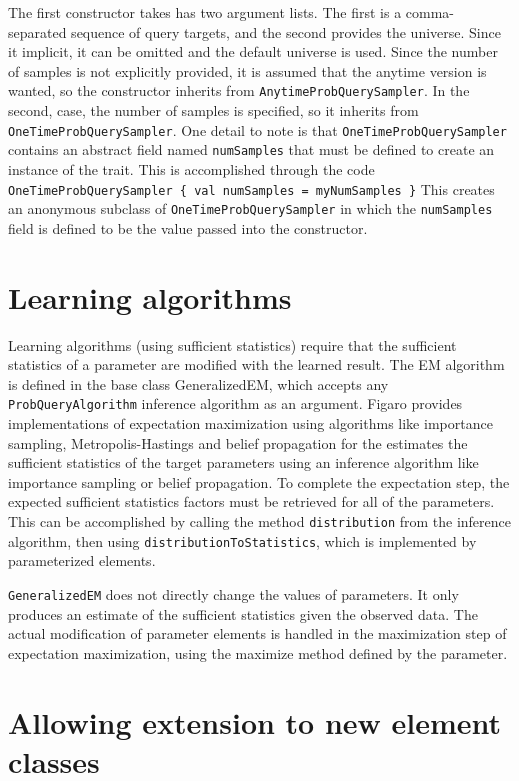 The first constructor takes has two argument lists. The first is a comma-separated sequence of query targets, and the second provides the universe. Since it implicit, it can be omitted and the default universe is used. Since the number of samples is not explicitly provided, it is assumed that the anytime version is wanted, so the constructor inherits from \texttt{AnytimeProbQuerySampler}. In the second, case, the number of samples is specified, so it inherits from \texttt{OneTimeProbQuerySampler}. One detail to note is that \texttt{OneTimeProbQuerySampler} contains an abstract field named \texttt{numSamples} that must be defined to create an instance of the trait. This is accomplished through the code
\newline \texttt{OneTimeProbQuerySampler \{ val numSamples = myNumSamples \}}
This creates an anonymous subclass of \texttt{OneTimeProbQuerySampler} in which the \texttt{numSamples} field is defined to be the value passed into the constructor.

\section{Learning algorithms}

Learning algorithms (using sufficient statistics) require that the sufficient statistics of a parameter are modified with the learned result. The EM algorithm is defined in the base class GeneralizedEM, which accepts any \texttt{ProbQueryAlgorithm} inference algorithm as an argument. Figaro provides implementations of expectation maximization using algorithms like importance sampling, Metropolis-Hastings and belief propagation for the estimates the sufficient statistics of the target parameters using an inference algorithm like importance sampling or belief propagation. To complete the expectation step, the expected sufficient statistics factors must be retrieved for all of the parameters. This can be accomplished by calling the method \texttt{distribution} from the inference algorithm, then using \texttt{distributionToStatistics}, which is implemented by parameterized elements.

\texttt{GeneralizedEM} does not directly change the values of parameters. It only produces an estimate of the sufficient statistics given the observed data. The actual modification of parameter elements is handled in the maximization step of expectation maximization, using the maximize method defined by the parameter. 

\section{Allowing extension to new element classes}

